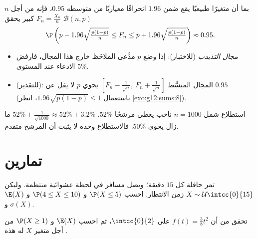 \begin{method}\label{met:g12:contdist:fluctuation}
بما أن متغيرًا طبيعيًا يقع ضمن $1.96$ انحرافًا معياريًا من متوسطه
 $0.95$، فإنه من أجل $n$ كبير يحقق 
$F_n = \frac{X_n}{n}$  $\mathcal B(n,p)$
\[
\P\left(p - 1.96\sqrt{\tfrac{p(1-p)}{n}} \leq F_n \leq
p + 1.96\sqrt{\tfrac{p(1-p)}{n}}\right) \approx 0.95 .
\]
\begin{itemize}
  \item \emph{مجال التذبذب} (للاختبار): إذا وضع $p$ مدَّعى
         الملاحَظ خارج هذا المجال، فارفض الادعاء عند
        المستوى $5\%$.
  \item \emph{} (للتقدير): المجال المبسَّط
        $\left[F_n - \frac{1}{\sqrt n},\ F_n + \frac{1}{\sqrt n}\right]$
        يحوي $p$  لا يقل عن $0.95$
        (باستعمال $1.96\sqrt{p(1-p)} \leq 1$، انظر \cref{exo:g12:sums:8}).
\end{itemize}
\end{method}

\begin{example}\label{ex:g12:contdist:poll}
استطلاع شمل $n = 1000$ ناخب يعطي مرشحًا $52\%$. 
$52\% \pm \frac{1}{\sqrt{1000}} \approx 52\% \pm 3.2\%$ ما زال
يحوي $50\%$: فالاستطلاع وحده لا يثبت أن المرشح
متقدم.
\end{example}

\section{تمارين}

\begin{exercise}[$\star$]\label{exo:g12:contdist:1}
تمر حافلة كل $15$ دقيقة؛ ويصل مسافر في لحظة عشوائية
منتظمة. وليكن $X \sim \mathcal U\intcc{0}{15}$ زمن الانتظار. احسب
$\P(X \leq 5)$ و $\P(4 \leq X \leq 10)$ و $\E(X)$ و $\sigma(X)$.
\end{exercise}

\begin{exercise}[$\star$]\label{exo:g12:contdist:2}
تحقق من أن $f(t) = \frac{3}{8}t^2$  على $\intcc{0}{2}$، ثم
احسب $\E(X)$ و $\P(X \geq 1)$ من أجل متغير $X$ له هذه .
\end{exercise}

